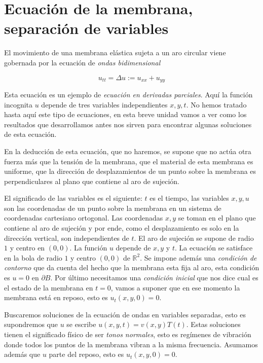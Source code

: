 %
\chapter[Separacion de Variables]{Ecuación de la membrana, separación de variables}

El movimiento de una membrana elástica sujeta a un aro circular viene gobernada por la ecuación de \emph{ondas bidimensional}

\[ u_{tt}=\Delta u:=u_{xx}+u_{yy}\]

Esta ecuación es un ejemplo de \emph{ecuación en derivadas parciales}. Aquí la función incognita $u$ depende de tres variables independientes $x,y,t$. No hemos tratado hasta aquí este tipo de ecuaciones, en esta breve unidad vamos a ver como los resultados que desarrollamos antes  nos sirven para encontrar algunas soluciones de esta ecuación.  

En la deducción de esta ecuación, que no haremos, se supone que no actúa otra fuerza más que la tensión de la membrana, que el material de esta membrana es uniforme, que la dirección de desplazamientos de un punto sobre la membrana es perpendiculares al plano que contiene al aro de sujeción. 

El significado de las variables es el siguiente: $t$ es el tiempo, las variables $x,y,u$ son las coordenadas de un punto sobre la membrana en un sistema de coordenadas cartesiano ortogonal. Las coordenadas $x,y$     se toman en el plano que contiene al aro de sujeción y por ende, como el desplazamiento es solo en la dirección vertical, son independientes de $t$. El aro de sujeción  se supone de radio $1$ y centro en $(0,0)$.  La función  $u$ depende de  $x,y$ y  $t$. La ecuación  se satisface en la bola de radio $1$ y centro $(0,0)$ de $\mathbb{R}^2$.  Se impone además una \emph{condición de contorno} que da cuenta del hecho que la membrana esta fija al aro, esta condición es  $u=0$ en $\partial B$. Por último necesitamos  una \emph{condición inicial} que nos dice cual es el estado de la membrana en $t=0$, vamos a suponer que en ese momento la membrana está en reposo, esto es  $u_t(x,y,0)=0$.

 Buscaremos soluciones de la ecuación de ondas en variables separadas, esto es supondremos que $u$ se escribe  $u(x,y,t)=v(x,y)T(t)$. Estas soluciones tienen el significado físico de ser \emph{tonos normales}, esto es regímenes de vibración donde todos los puntos de la membrana vibran a la misma frecuencia. Asumamos además  que $u$ parte del reposo, esto es $u_t(x,y,0)=0$. 

